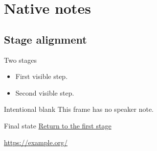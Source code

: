\section{Native notes}
\subsection{Stage alignment}
\begin{frame}[label=notes-first]{Two stages}
  \begin{itemize}
    \item<1-> First visible step.
    \item<2-> Second visible step.
  \end{itemize}
\end{frame}
\begin{frame}{Intentional blank}
  This frame has no speaker note.
\end{frame}
\begin{frame}{Final state}
  \hyperlink{notes-first}{Return to the first stage}
  \par\url{https://example.org/}
\end{frame}
